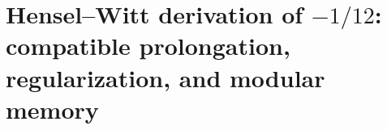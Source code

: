 \chapter{Hensel--Witt derivation of \(-1/12\): compatible prolongation, regularization, and modular memory}
\label{chap:p3-final:33:menos_un_doceavo}

